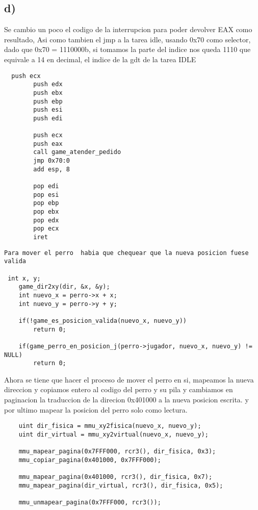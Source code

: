 \subsection{d)}
Se cambio un poco el codigo de la interrupcion para poder devolver EAX como resultado,
Asi como tambien el jmp a la tarea idle, usando 0x70 como selector, dado que 0x70 = 1110000b, si tomamos la parte del indice nos queda 1110 que equivale a 14 en decimal, el indice de la gdt de la tarea IDLE
  \begin{codesnippet}
\begin{verbatim}
  push ecx
        push edx
        push ebx
        push ebp
        push esi
        push edi

        push ecx
        push eax
        call game_atender_pedido
        jmp 0x70:0
        add esp, 8

        pop edi
        pop esi
        pop ebp
        pop ebx
        pop edx
        pop ecx
        iret    
   \end{verbatim}
\end{codesnippet}
  \begin{codesnippet}
\begin{verbatim}
Para mover el perro  habia que chequear que la nueva posicion fuese valida

 int x, y;
    game_dir2xy(dir, &x, &y);
    int nuevo_x = perro->x + x;
    int nuevo_y = perro->y + y;

    if(!game_es_posicion_valida(nuevo_x, nuevo_y))
        return 0;

    if(game_perro_en_posicion_j(perro->jugador, nuevo_x, nuevo_y) != NULL)
        return 0;
   \end{verbatim}
\end{codesnippet}
 
Ahora se tiene que hacer el proceso de mover el perro en si, mapeamos la nueva direccion y copiamos entero al codigo del perro y su pila
y cambiamos en paginacion la traduccion de la direcion 0x401000 a la nueva posicion escrita. y por ultimo mapear la posicion del perro solo como lectura.
  \begin{codesnippet}
\begin{verbatim}
    uint dir_fisica = mmu_xy2fisica(nuevo_x, nuevo_y);
    uint dir_virtual = mmu_xy2virtual(nuevo_x, nuevo_y);

    mmu_mapear_pagina(0x7FFF000, rcr3(), dir_fisica, 0x3);
    mmu_copiar_pagina(0x401000, 0x7FFF000);

    mmu_mapear_pagina(0x401000, rcr3(), dir_fisica, 0x7);
    mmu_mapear_pagina(dir_virtual, rcr3(), dir_fisica, 0x5);

    mmu_unmapear_pagina(0x7FFF000, rcr3());
   \end{verbatim}
\end{codesnippet}
 
